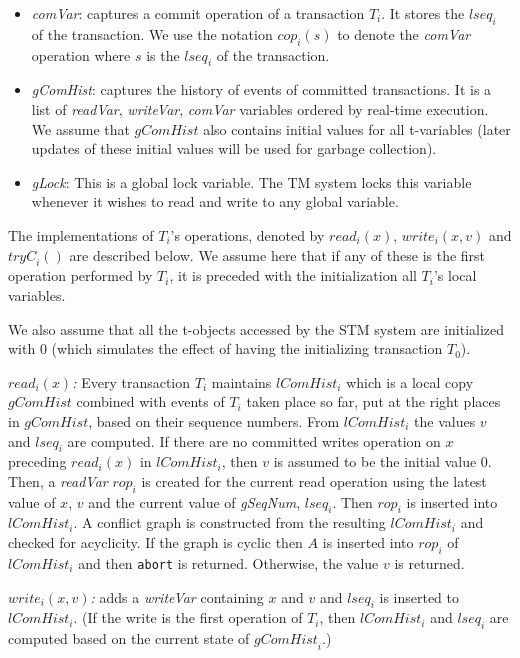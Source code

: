 \documentclass{llncs}
\newcommand{\op} {operation}
\newcommand{\tobj} {t-object}
\newcommand{\gchist} {\textit{gComHist}}
\newcommand{\lchist} {\textit{lComHist}}
\newcommand{\gchlock} {\textit{gLock}}
\newcommand{\gseqn}{\textit{gSeqNum}}
\newcommand{\lseq} {\textit{lseq}}
\newcommand{\tryc} {\textit{tryC}}
\newcommand{\rvar} {\textit{readVar}}
\newcommand{\rop} {\textit{rop}}
\newcommand{\wvar} {\textit{writeVar}}
\newcommand{\cvar} {\textit{comVar}}
\newcommand{\cop} {\textit{cop}}
\begin{document}
\begin{itemize}
\item \textit{\cvar}: captures a commit \op{} of a transaction $T_i$. 
It stores the $\lseq_i$ of the transaction. We use the notation
$\cop_i(s)$ to denote the \cvar{} \op{} where $s$ is the $\lseq_i$ of
the transaction. 


\item \textit{\gchist}: captures the history of events of committed
transactions. It is a list of \rvar, \wvar, \cvar{} variables ordered 
by real-time execution. 
We assume that $\gchist$ also contains initial 
values for all t-variables (later updates of these initial values 
will be used for garbage collection).


\item \textit{\gchlock}: This is a global lock variable. The TM system
locks this variable whenever it wishes to read and write to any global variable.

\end{itemize}

The implementations of $T_i$'s {\op}s, denoted by $read_i(x)$, $write_i(x, v)$ and $\tryc_i()$ are described below. We assume here that if any of these is the first operation performed by $T_i$, it is preceded with the initialization all $T_i$'s local variables. 

We also assume that all the \tobj{s} accessed by the STM system are initialized with $0$ (which simulates the effect of having the initializing transaction $T_0$). 



\vspace{1mm}
\noindent
\textit{$read_i(x)$:} 
Every transaction $T_i$ maintains $\lchist_i$ which is a local copy
$\gchist$ combined with events of $T_i$ taken place so far, put at
the right places in $\gchist$, based on their sequence numbers. 
From $\lchist_i$ the values $v$ and $\lseq_i$ are computed. 
If there are no committed writes \op{} on $x$ preceding $read_i(x)$ in
$\lchist_i$, then $v$ is assumed to be the initial value $0$. 
Then, a \rvar{} $\rop_i$ is created for the current read \op{} using
the latest value of $x$, $v$ and the current value of \gseqn,
$\lseq_i$. Then $\rop_i$ is inserted into $\lchist_i$.    
A conflict graph is constructed from the resulting $\lchist_i$ and
checked for acyclicity. If the graph is cyclic then $A$ is inserted
into $\rop_i$ of $\lchist_i$ and then \texttt{abort} is returned. 
Otherwise, the value $v$ is returned. 

\vspace{1mm}
\noindent
\textit{$write_i(x, v)$:} adds a \wvar{} containing $x$ and $v$ and
$\lseq_i$ is inserted to $\lchist_i$.
(If the write is the first operation of $T_i$, then $\lchist_i$ and
$\lseq_i$ are computed based on the current state of  $\gchist_i$.)
\end{document}
